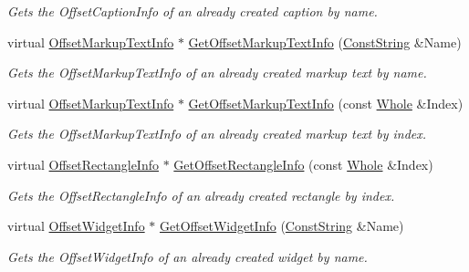 \begin{DoxyCompactItemize}
\begin{DoxyCompactList}\small\item\em Gets the OffsetCaptionInfo of an already created caption by name. \item\end{DoxyCompactList}\item 
virtual \hyperlink{structMezzanine_1_1UI_1_1ResizingInfo}{OffsetMarkupTextInfo} $\ast$ \hyperlink{classMezzanine_1_1UI_1_1RenderableContainerWidget_ac399e3b87cb416612916a83db872edbb}{GetOffsetMarkupTextInfo} (\hyperlink{namespaceMezzanine_a63cd699ac54b73953f35ec9cfc05e506}{ConstString} \&Name)
\begin{DoxyCompactList}\small\item\em Gets the OffsetMarkupTextInfo of an already created markup text by name. \item\end{DoxyCompactList}\item 
virtual \hyperlink{structMezzanine_1_1UI_1_1ResizingInfo}{OffsetMarkupTextInfo} $\ast$ \hyperlink{classMezzanine_1_1UI_1_1RenderableContainerWidget_a6e6cf9cca3582fe18e29e06005c4b100}{GetOffsetMarkupTextInfo} (const \hyperlink{namespaceMezzanine_adcbb6ce6d1eb4379d109e51171e2e493}{Whole} \&Index)
\begin{DoxyCompactList}\small\item\em Gets the OffsetMarkupTextInfo of an already created markup text by index. \item\end{DoxyCompactList}\item 
virtual \hyperlink{structMezzanine_1_1UI_1_1ResizingInfo}{OffsetRectangleInfo} $\ast$ \hyperlink{classMezzanine_1_1UI_1_1RenderableContainerWidget_aadbd42f96fcdd57ece45b945b7e647e8}{GetOffsetRectangleInfo} (const \hyperlink{namespaceMezzanine_adcbb6ce6d1eb4379d109e51171e2e493}{Whole} \&Index)
\begin{DoxyCompactList}\small\item\em Gets the OffsetRectangleInfo of an already created rectangle by index. \item\end{DoxyCompactList}\item 
virtual \hyperlink{structMezzanine_1_1UI_1_1ResizingInfo}{OffsetWidgetInfo} $\ast$ \hyperlink{classMezzanine_1_1UI_1_1RenderableContainerWidget_ac361c86ce02772e4206d20159fd4d49f}{GetOffsetWidgetInfo} (\hyperlink{namespaceMezzanine_a63cd699ac54b73953f35ec9cfc05e506}{ConstString} \&Name)
\begin{DoxyCompactList}\small\item\em Gets the OffsetWidgetInfo of an already created widget by name. \item\end{DoxyCompactList}\item 

\end{DoxyCompactItemize}
